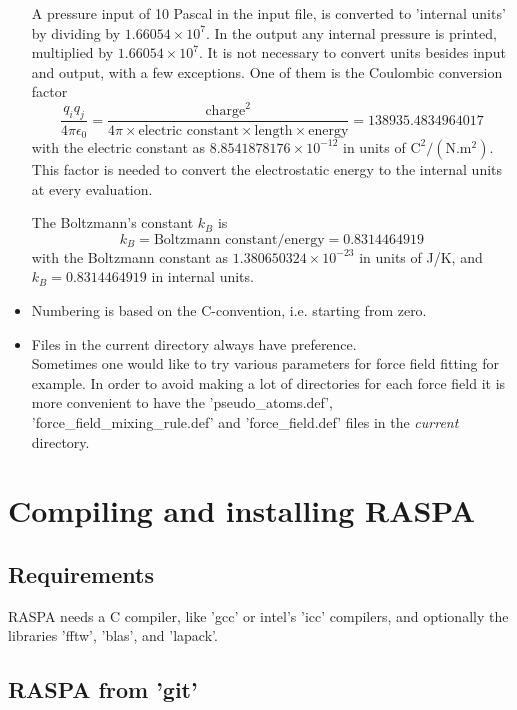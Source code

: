 \begin{itemize}
A pressure input of 10 Pascal in the input file, is converted to 'internal units' by dividing by $1.66054\times10^7$. In the
output any internal pressure is printed, multiplied by $1.66054\times10^7$. It is not necessary to convert units besides
input and output, with a few exceptions. One of them is the Coulombic conversion factor
\begin{equation}
  \frac{q_i q_j}{4\pi \epsilon_0}=\frac{\text{charge}^2}{4 \pi \times \text{electric constant}\times\text{length}\times\text{energy}}=138935.4834964017
\end{equation}
with the electric constant as $8.8541878176\times10^{-12}$ in units of $\text{C}^2/(\text{N}.\text{m}^2)$. This factor is needed to convert the
electrostatic energy to the internal units at every evaluation. 

\noindent
The Boltzmann's constant $k_B$ is
\begin{equation}
 k_B=\text{Boltzmann constant}/\text{energy}=0.8314464919
\end{equation}
with the Boltzmann constant as $1.380650324\times10^{-23}$ in units of J/K, and $k_B=0.8314464919$ in internal units.

\item{Numbering is based on the C-convention, i.e. starting from zero.}
\item{Files in the current directory always have preference.}\\
Sometimes one would like to try various parameters for force field fitting for example. In order to avoid
making a lot of directories for each force field it is more convenient to have the 
'pseudo\_atoms.def', 'force\_field\_mixing\_rule.def'
and 'force\_field.def' files in the \emph{current} directory.
\end{itemize}

\section{Compiling and installing RASPA}

\subsection{Requirements}

RASPA needs a C compiler, like 'gcc' or intel's 'icc' compilers, and optionally 
the libraries 'fftw', 'blas', and 'lapack'.

\subsection{RASPA from 'git'}

